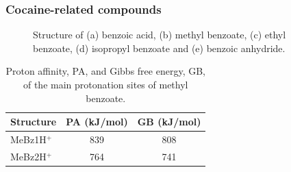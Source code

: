 \subsubsection{Cocaine-related compounds}

\begin{figure}%
\begin{center}
\begin{subfloatrow}
\quad\quad
{}
\quad\quad
{}
\end{subfloatrow}
\bigskip
\quad\quad
{}
\end{center}
\caption{Structure of (a) benzoic acid,  (b) methyl benzoate, (c) ethyl benzoate, (d) isopropyl benzoate and (e) benzoic anhydride.}\label{fig:cocr}
\end{figure}




\begin{table}%
\centering
\caption{Proton affinity, PA, and Gibbs free energy, GB, of the main protonation sites of methyl benzoate.}
\label{tb:mb1}
\begin{tabular}{lcc}
\toprule
\textbf{Structure} &\textbf{PA (kJ/mol)} &\textbf{GB (kJ/mol)}\\ \toprule
MeBz1H$^+$  & 839 &   808    \\
MeBz2H$^+$  & 764 &   741    \\
\bottomrule
\end{tabular}
\end{table}

